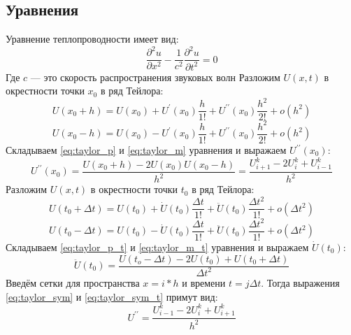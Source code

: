 \documentclass[a4paper]{article}
\begin{document}
    \subsection{Уравнения}
        Уравнение теплопроводности имеет вид:
        \begin{equation}\label{eq:parabol_eq}
            \frac{\partial^2 u}{\partial x^2} - \frac{1}{c^{2}} \frac{\partial^2 u}{\partial t^2}=0
        \end{equation}
        Где $c$ --- это скорость распространения звуковых волн
        Разложим $U(x,t)$ в окрестности точки $x_0$ в ряд Тейлора:
        \begin{equation}\label{eq:taylor_p}
            U(x_0+h)=U(x_0)+U^{\prime}(x_0) \frac{h}{1!}+U^{\prime \prime}(x_0) \frac{h^{2}}{2!}+o(h^2)
        \end{equation}
        \begin{equation}\label{eq:taylor_m} 
            U(x_0-h)=U(x_0)-U^{\prime}(x_0) \frac{h}{1!}+U^{\prime \prime}(x_0) \frac{h^{2}}{2!}+o(h^2)
        \end{equation}
        Складываем \ref{eq:taylor_p} и \ref{eq:taylor_m} уравнения и выражаем $ U^{\prime \prime}(x_0) $:
        \begin{equation}\label{eq:taylor_sym} 
            U^{\prime \prime}(x_0)=\frac{U(x_0+h)-2 U(x_0) U(x_0-h)}{h^2}=\frac{U^{k}_{i+1}-2 U^{k}_{i}+U^{k}_{i-1}}{h^2}
        \end{equation}
        Разложим $U(x,t)$ в окрестности точки $t_0$ в ряд Тейлора:
        \begin{equation}\label{eq:taylor_p_t} 
            U(t_0+\Delta t)=U(t_0)+\dot{U}(t_0) \frac{\Delta t}{1!}+\ddot{U}(t_0) \frac{\Delta t^2}{1!}+o(\Delta t^{2})
        \end{equation}
        \begin{equation}\label{eq:taylor_m_t} 
            U(t_0-\Delta t)=U(t_0)-\dot{U}(t_0) \frac{\Delta t}{1!}+\ddot{U}(t_0) \frac{\Delta t^2}{1!}+o(\Delta t^{2})
        \end{equation}
        Складываем \ref{eq:taylor_p_t} и \ref{eq:taylor_m_t} уравнения и выражаем $ \dot{U}(t_0) $:
        \begin{equation}\label{eq:taylor_sym_t} 
            \ddot{U}(t_0)=\frac{U(t_o-\Delta t)-2 U(t_0)+U(t_0+\Delta t)}{\Delta t^2}
        \end{equation}
        Введём сетки для пространства $x=i*h$ и времени $t=j \Delta t$. Тогда выражения \ref{eq:taylor_sym} и \ref{eq:taylor_sym_t} примут вид: 
        \begin{equation}\label{eq:mkr} 
            U^{\prime \prime} = \frac{U^{k}_{i-1}-2 U^{k}_{i}+U^{k}_{i+1}}{h^2}
        \end{equation}
\end{document}
